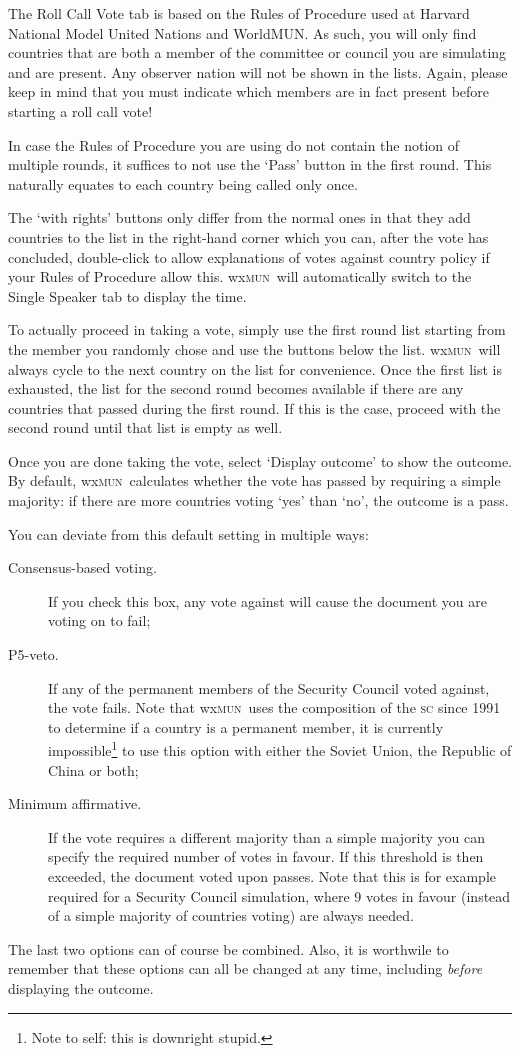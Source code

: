 \documentclass[11pt, a4paper]{article}
\newcommand\wxMUN{wx\textsc{mun}}
\begin{document}
The Roll Call Vote tab is based on the Rules of Procedure used at Harvard National Model United Nations and WorldMUN. As such, you will only find countries that are both a member of the committee or council you are simulating and are present. Any observer nation will not be shown in the lists. Again, please keep in mind that you must indicate which members are in fact present before starting a roll call vote!

In case the Rules of Procedure you are using do not contain the notion of multiple rounds, it suffices to not use the `Pass' button in the first round. This naturally equates to each country being called only once. 

The `with rights' buttons only differ from the normal ones in that they add countries to the list in the right-hand corner which you can, after the vote has concluded, double-click to allow explanations of votes against country policy if your Rules of Procedure allow this. \wxMUN\ will automatically switch to the Single Speaker tab to display the time.

To actually proceed in taking a vote, simply use the first round list starting from the member you randomly chose and use the buttons below the list. \wxMUN\ will always cycle to the next country on the list for convenience. Once the first list is exhausted, the list for the second round becomes available if there are any countries that passed during the first round. If this is the case, proceed with the second round until that list is empty as well.

Once you are done taking the vote, select `Display outcome' to show the outcome. By default, \wxMUN\ calculates whether the vote has passed by requiring a simple majority: if there are more countries voting `yes' than `no', the outcome is a pass.

You can deviate from this default setting in multiple ways:

\begin{description}
\item[Consensus-based voting.] If you check this box, any vote against will cause the document you are voting on to fail;
\item[P5-veto.] If any of the permanent members of the Security Council voted against, the vote fails. Note that \wxMUN\ uses the composition of the \textsc{sc} since 1991 to determine if a country is a permanent member, it is currently impossible\footnote{Note to self: this is downright stupid.} to use this option with either the Soviet Union, the Republic of China or both;
\item[Minimum affirmative.] If the vote requires a different majority than a simple majority you can specify the required number of votes in favour. If this threshold is then exceeded, the document voted upon passes. Note that this is for example required for a Security Council simulation, where 9 votes in favour (instead of a simple majority of countries voting) are always needed.
\end{description}
The last two options can of course be combined. Also, it is worthwile to remember that these options can all be changed at any time, including \emph{before} displaying the outcome.
\end{document}
